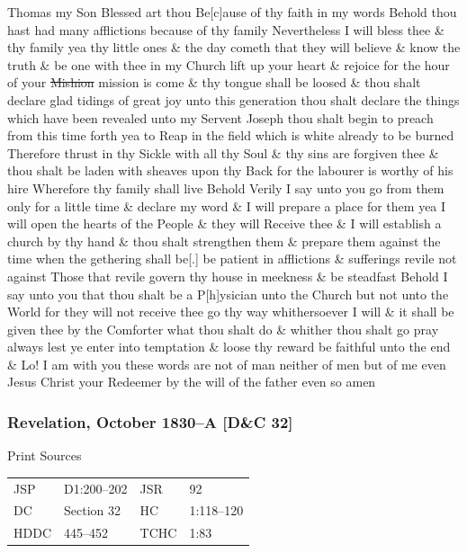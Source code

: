 				Thomas my Son Blessed art thou Be[c]ause of thy faith in my words Behold thou hast had many afflictions because of thy family Nevertheless I will bless thee \& thy family yea thy little ones \& the day cometh that they will believe \& know the truth \& be one with thee in my Church lift up your heart \& rejoice for the hour of your \sout{Mishion} mission is come \& thy tongue shall be loosed \& thou shalt declare glad tidings of great joy unto this generation thou shalt declare the things which have been revealed unto my Servent Joseph thou shalt begin to preach from this time forth yea to Reap in the field which is white already to be burned Therefore thrust in thy Sickle with all thy Soul \& thy sins are forgiven thee \& thou shalt be laden with sheaves upon thy Back for the labourer is worthy of his hire Wherefore thy family shall live Behold Verily I say unto you go from them only for a little time \& declare my word \& I will prepare a place for them yea I will open the hearts of the People \& they will Receive thee \& I will establish a church by thy hand \& thou shalt strengthen them \& prepare them against the time when the gethering shall be[.] be patient in afflictions \& sufferings revile not against Those that revile govern thy house in meekness \& be steadfast Behold I say unto you that thou shalt be a P[h]ysician unto the Church but not unto the World for they will not receive thee go thy way whithersoever I will \& it shall be given thee by the Comforter what thou shalt do \& whither thou shalt go pray always lest ye enter into temptation \& loose thy reward be faithful unto the end \& Lo! I am with you these words are not of man neither of men but of me even Jesus Christ your Redeemer by the will of the father even so amen
				
		\subsubsection{Revelation, October 1830--A [D\&C 32]}
			\label{EMS-1830-JS-OCT-1830-A}
		
			\begin{description}
				\item[Print Sources]
			\end{description}

				\begin{tabular}{p{0.5in}p{1in}p{0.5in}p{1in}}
				JSP	 	& D1:200--202	& JSR 		& 92	 \\
				DC	 	& Section 32	& HC 		& 1:118--120 \\
				HDDC 	& 445--452		& TCHC 		& 1:83 \\
				\end{tabular}
			
